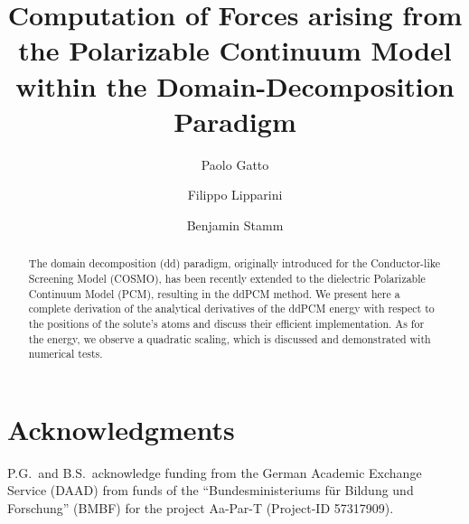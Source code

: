 \documentclass[aip,jcp,a4paper,11pt]{revtex4-1}
\begin{document}
\title{Computation of Forces arising from the Polarizable Continuum Model within the Domain-Decomposition Paradigm}

\author{Paolo Gatto}
\affiliation{}

\author{Filippo Lipparini}

\author{Benjamin Stamm}
\affiliation{}



\begin{abstract}
The domain decomposition (dd) paradigm, originally introduced for the Conductor-like Screening Model (COSMO), has been recently extended to the dielectric Polarizable Continuum Model (PCM), resulting in the ddPCM method. We present here a complete derivation of the analytical derivatives of the ddPCM energy with respect to the positions of the solute's atoms and discuss their efficient implementation. As for the energy, we observe a quadratic scaling, which is discussed and demonstrated with numerical tests.  

\end{abstract}

\maketitle


%






\section*{Acknowledgments}
P.G.~and B.S.~acknowledge funding from the German Academic Exchange Service (DAAD) from funds of the ``Bundesministeriums f\"ur Bildung und Forschung'' (BMBF) for the project Aa-Par-T (Project-ID 57317909).
\appendix




%



\end{document}
